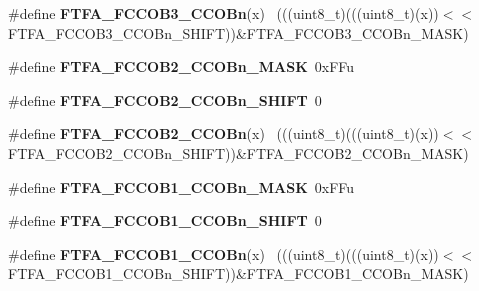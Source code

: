 \begin{DoxyCompactItemize}
\item 
\hypertarget{group___f_t_f_a___register___masks_ga63553c17b66b2a4dcaa6ac9bae1bf2e7}{}\#define {\bfseries F\+T\+F\+A\+\_\+\+F\+C\+C\+O\+B3\+\_\+\+C\+C\+O\+Bn}(x)                                      ~(((uint8\+\_\+t)(((uint8\+\_\+t)(x))$<$$<$F\+T\+F\+A\+\_\+\+F\+C\+C\+O\+B3\+\_\+\+C\+C\+O\+Bn\+\_\+\+S\+H\+I\+F\+T))\&F\+T\+F\+A\+\_\+\+F\+C\+C\+O\+B3\+\_\+\+C\+C\+O\+Bn\+\_\+\+M\+A\+S\+K)\label{group___f_t_f_a___register___masks_ga63553c17b66b2a4dcaa6ac9bae1bf2e7}

\item 
\hypertarget{group___f_t_f_a___register___masks_gafce9dd30cc49db588976cffd40ff31a3}{}\#define {\bfseries F\+T\+F\+A\+\_\+\+F\+C\+C\+O\+B2\+\_\+\+C\+C\+O\+Bn\+\_\+\+M\+A\+S\+K}~0x\+F\+Fu\label{group___f_t_f_a___register___masks_gafce9dd30cc49db588976cffd40ff31a3}

\item 
\hypertarget{group___f_t_f_a___register___masks_gaf5731dc9ee3c6ce6fdd7c31a20bb0e6c}{}\#define {\bfseries F\+T\+F\+A\+\_\+\+F\+C\+C\+O\+B2\+\_\+\+C\+C\+O\+Bn\+\_\+\+S\+H\+I\+F\+T}~0\label{group___f_t_f_a___register___masks_gaf5731dc9ee3c6ce6fdd7c31a20bb0e6c}

\item 
\hypertarget{group___f_t_f_a___register___masks_gaa9e7183e2ccf47b3c252e0e0192fc352}{}\#define {\bfseries F\+T\+F\+A\+\_\+\+F\+C\+C\+O\+B2\+\_\+\+C\+C\+O\+Bn}(x)                                      ~(((uint8\+\_\+t)(((uint8\+\_\+t)(x))$<$$<$F\+T\+F\+A\+\_\+\+F\+C\+C\+O\+B2\+\_\+\+C\+C\+O\+Bn\+\_\+\+S\+H\+I\+F\+T))\&F\+T\+F\+A\+\_\+\+F\+C\+C\+O\+B2\+\_\+\+C\+C\+O\+Bn\+\_\+\+M\+A\+S\+K)\label{group___f_t_f_a___register___masks_gaa9e7183e2ccf47b3c252e0e0192fc352}

\item 
\hypertarget{group___f_t_f_a___register___masks_ga17fce81c2555358f011d813a6f3904ac}{}\#define {\bfseries F\+T\+F\+A\+\_\+\+F\+C\+C\+O\+B1\+\_\+\+C\+C\+O\+Bn\+\_\+\+M\+A\+S\+K}~0x\+F\+Fu\label{group___f_t_f_a___register___masks_ga17fce81c2555358f011d813a6f3904ac}

\item 
\hypertarget{group___f_t_f_a___register___masks_ga077f35706cef4a20a363eb6980f65baf}{}\#define {\bfseries F\+T\+F\+A\+\_\+\+F\+C\+C\+O\+B1\+\_\+\+C\+C\+O\+Bn\+\_\+\+S\+H\+I\+F\+T}~0\label{group___f_t_f_a___register___masks_ga077f35706cef4a20a363eb6980f65baf}

\item 
\hypertarget{group___f_t_f_a___register___masks_ga48c7e140b87d61be6d4ab9dd1a86878c}{}\#define {\bfseries F\+T\+F\+A\+\_\+\+F\+C\+C\+O\+B1\+\_\+\+C\+C\+O\+Bn}(x)                                      ~(((uint8\+\_\+t)(((uint8\+\_\+t)(x))$<$$<$F\+T\+F\+A\+\_\+\+F\+C\+C\+O\+B1\+\_\+\+C\+C\+O\+Bn\+\_\+\+S\+H\+I\+F\+T))\&F\+T\+F\+A\+\_\+\+F\+C\+C\+O\+B1\+\_\+\+C\+C\+O\+Bn\+\_\+\+M\+A\+S\+K)\label{group___f_t_f_a___register___masks_ga48c7e140b87d61be6d4ab9dd1a86878c}


\end{DoxyCompactItemize}
